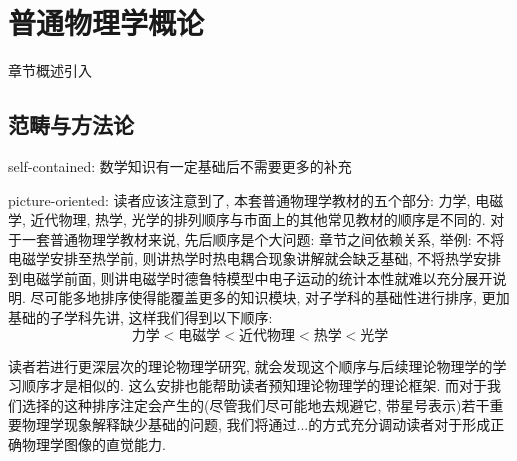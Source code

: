 \chapter{普通物理学概论}\label{1}

章节概述引入

\section{范畴与方法论}\label{1-1}

self-contained: 数学知识有一定基础后不需要更多的补充

picture-oriented: 读者应该注意到了, 本套普通物理学教材的五个部分: 力学, 电磁学, 近代物理, 热学, 光学的排列顺序与市面上的其他常见教材的顺序是不同的. 对于一套普通物理学教材来说, 先后顺序是个大问题: 章节之间依赖关系, 举例: 不将电磁学安排至热学前, 则讲热学时热电耦合现象讲解就会缺乏基础, 不将热学安排到电磁学前面, 则讲电磁学时德鲁特模型中电子运动的统计本性就难以充分展开说明. 尽可能多地排序使得能覆盖更多的知识模块, 对子学科的基础性进行排序, 更加基础的子学科先讲, 这样我们得到以下顺序:
\[\text{力学}<\text{电磁学}<\text{近代物理}<\text{热学}<\text{光学}\]

读者若进行更深层次的理论物理学研究, 就会发现这个顺序与后续理论物理学的学习顺序才是相似的. 这么安排也能帮助读者预知理论物理学的理论框架. 而对于我们选择的这种排序注定会产生的(尽管我们尽可能地去规避它, 带星号表示)若干重要物理学现象解释缺少基础的问题, 我们将通过...的方式充分调动读者对于形成正确物理学图像的直觉能力.